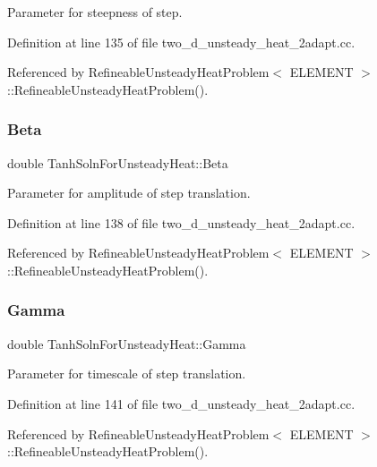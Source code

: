 Parameter for steepness of step. 



Definition at line 135 of file two\+\_\+d\+\_\+unsteady\+\_\+heat\+\_\+2adapt.\+cc.



Referenced by Refineable\+Unsteady\+Heat\+Problem$<$ E\+L\+E\+M\+E\+N\+T $>$\+::\+Refineable\+Unsteady\+Heat\+Problem().

\mbox{\label{namespaceTanhSolnForUnsteadyHeat_a66f6116310a5f9f96c2d3bf28250a92b}} 
\subsubsection{\texorpdfstring{Beta}{Beta}}
{\footnotesize\ttfamily double Tanh\+Soln\+For\+Unsteady\+Heat\+::\+Beta}



Parameter for amplitude of step translation. 



Definition at line 138 of file two\+\_\+d\+\_\+unsteady\+\_\+heat\+\_\+2adapt.\+cc.



Referenced by Refineable\+Unsteady\+Heat\+Problem$<$ E\+L\+E\+M\+E\+N\+T $>$\+::\+Refineable\+Unsteady\+Heat\+Problem().

\mbox{\label{namespaceTanhSolnForUnsteadyHeat_a5bb742b074ab5f3f65286b1cff1f1512}} 
\subsubsection{\texorpdfstring{Gamma}{Gamma}}
{\footnotesize\ttfamily double Tanh\+Soln\+For\+Unsteady\+Heat\+::\+Gamma}



Parameter for timescale of step translation. 



Definition at line 141 of file two\+\_\+d\+\_\+unsteady\+\_\+heat\+\_\+2adapt.\+cc.



Referenced by Refineable\+Unsteady\+Heat\+Problem$<$ E\+L\+E\+M\+E\+N\+T $>$\+::\+Refineable\+Unsteady\+Heat\+Problem().

